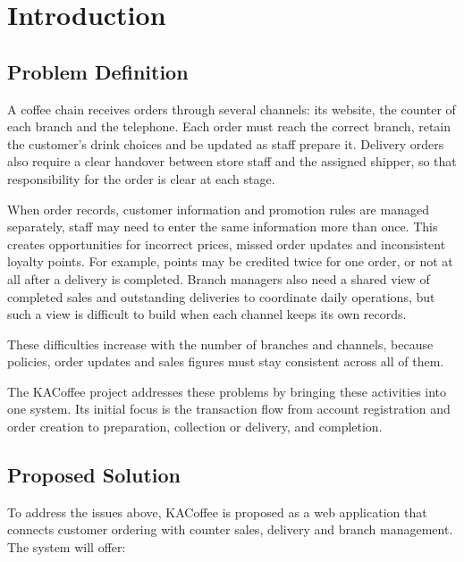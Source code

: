 \section{Introduction}

\subsection{Problem Definition}

A coffee chain receives orders through several channels: its website, the counter of each branch and the telephone. Each order must reach the correct branch, retain the customer's drink choices and be updated as staff prepare it. Delivery orders also require a clear handover between store staff and the assigned shipper, so that responsibility for the order is clear at each stage.

When order records, customer information and promotion rules are managed separately, staff may need to enter the same information more than once. This creates opportunities for incorrect prices, missed order updates and inconsistent loyalty points. For example, points may be credited twice for one order, or not at all after a delivery is completed. Branch managers also need a shared view of completed sales and outstanding deliveries to coordinate daily operations, but such a view is difficult to build when each channel keeps its own records.

These difficulties increase with the number of branches and channels, because policies, order updates and sales figures must stay consistent across all of them.

The KACoffee project addresses these problems by bringing these activities into one system. Its initial focus is the transaction flow from account registration and order creation to preparation, collection or delivery, and completion.

\subsection{Proposed Solution}

To address the issues above, KACoffee is proposed as a web application that connects customer ordering with counter sales, delivery and branch management. The system will offer:

